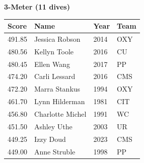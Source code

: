 \vspace{1.2em}
\noindent\begin{minipage}[t]{0.98\textwidth}
\centering
\textbf{\textcolor{teamprimary}{3-Meter (11 dives)}}\par
\vspace{0.5em}
\centering
\small
\renewcommand{\arraystretch}{1.0}
\setlength{\tabcolsep}{4pt}
\begin{tabular}{@{}p{2.5cm}p{4.5cm}p{1.5cm}p{2.5cm}@{}}
\toprule
\textbf{Score} & \textbf{Name} & \textbf{Year} & \textbf{Team} \\
\midrule
491.85 & Jessica Robson & 2014 & OXY \\
480.56 & Kellyn Toole & 2016 & CU \\
480.45 & Ellen Wang & 2017 & PP \\
474.20 & Carli Lessard & 2016 & CMS \\
472.20 & Marra Stankus & 1994 & OXY \\
461.70 & Lynn Hilderman & 1981 & CIT \\
456.80 & Charlotte Michel & 1991 & WC \\
451.50 & Ashley Uthe & 2003 & UR \\
449.25 & Izzy Doud & 2023 & CMS \\
449.00 & Anne Struble & 1998 & PP \\
\bottomrule
\end{tabular}
\end{minipage}
\clearpage
